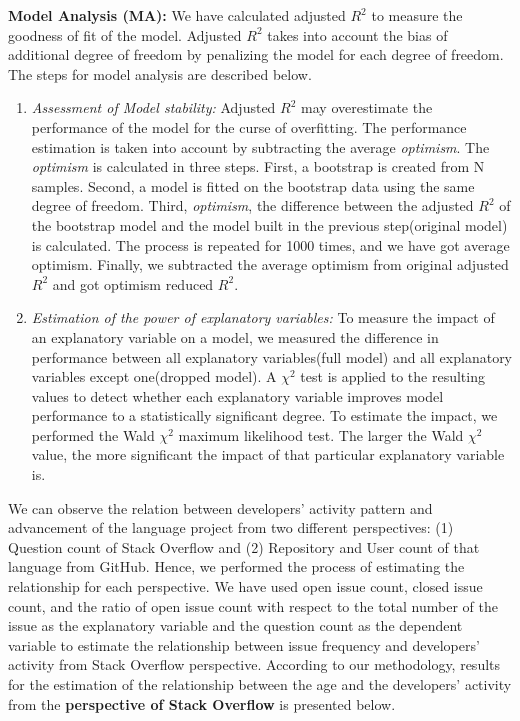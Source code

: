 \textbf{Model Analysis (MA):} 
We have calculated adjusted $R^2$ to measure the goodness of fit of the model. Adjusted $R^2$ takes into account the bias of additional degree of freedom by penalizing the model for each degree of freedom.
The steps for model analysis are described below.
\begin{enumerate}
    \item \emph{Assessment of Model stability:} 
    Adjusted $R^2$ may overestimate the performance of the model for the curse of overfitting. The performance estimation is taken into account by subtracting the average \emph{optimism}\citep{Efron1986}. The \emph{optimism} is calculated in three steps. First, a bootstrap is created from N samples. Second, a model is fitted on the bootstrap data using the same degree of freedom. Third, \emph{optimism}, the difference between the adjusted $R^2$ of the bootstrap model and the model built in the previous step(original model) is calculated. The process is repeated for 1000 times, and we have got average optimism. Finally, we subtracted the average optimism from original adjusted $R^2$ and got optimism reduced $R^2$.
    \item \emph{Estimation of the power of explanatory variables:}
    To measure the impact of an explanatory variable on a model, we measured the difference in performance between all explanatory variables(full model) and all explanatory variables except one(dropped model). A $\chi^2$ test is applied to the resulting values to detect whether each explanatory variable improves model performance to a statistically significant degree. To estimate the impact, we performed the Wald $\chi^2$ maximum likelihood test. The larger the Wald $\chi^2$ value, the more significant the impact of that particular explanatory variable is\citep{McIntosh2015}.

\end{enumerate}
We can observe the relation between developers' activity pattern and advancement of the language project from two different perspectives: (1) Question count of Stack Overflow and (2) Repository and User count of that language from GitHub. Hence, we performed the process of estimating the relationship for each perspective. We have used open issue count, closed issue count, and the ratio of open issue count with respect to the total number of the issue as the explanatory variable and the question count as the dependent variable to estimate the relationship between issue frequency and developers' activity from  Stack Overflow perspective. According to our methodology, results for the estimation of the relationship between the age and the developers' activity from the \textbf{perspective of Stack Overflow} is presented below.
